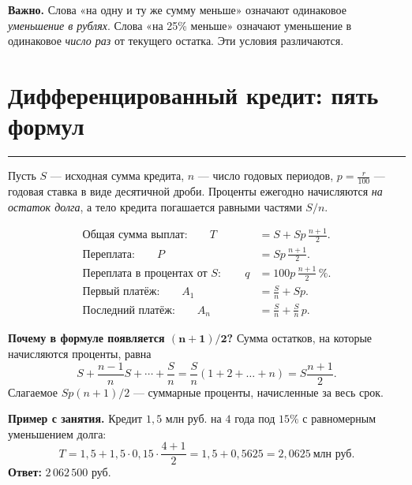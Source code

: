 \documentclass[a4paper,11pt]{article}
\newcommand{\key}[1]{\textcolor{darkaccent}{\textbf{#1}}}
\newcommand{\sepheading}[1]{\section{#1}\vspace{-4pt}\noindent\textcolor{accent}{\rule{\linewidth}{0.45pt}}\vspace{1pt}}
\begin{document}
\key{Важно.} Слова «на одну и ту же сумму меньше» означают одинаковое \emph{уменьшение в рублях}. Слова «на 25\% меньше» означают уменьшение в одинаковое \emph{число раз} от текущего остатка. Эти условия различаются.

\sepheading{Дифференцированный кредит: пять формул}
Пусть $S$ --- исходная сумма кредита, $n$ --- число годовых периодов, $p=\frac{r}{100}$ --- годовая ставка в виде десятичной дроби. Проценты ежегодно начисляются \emph{на остаток долга}, а тело кредита погашается равными частями $S/n$.

\begin{align*}
\text{Общая сумма выплат:}\qquad
T&=S+Sp\,\frac{n+1}{2}.\\[2pt]
\text{Переплата:}\qquad
P&=Sp\,\frac{n+1}{2}.\\[2pt]
\text{Переплата в процентах от }S:\qquad
q&=100p\,\frac{n+1}{2}\,\%.\\[2pt]
\text{Первый платёж:}\qquad
A_1&=\frac Sn+Sp.\\[2pt]
\text{Последний платёж:}\qquad
A_n&=\frac Sn+\frac Sn\,p.
\end{align*}

\textbf{Почему в формуле появляется $\boldsymbol{(n+1)/2}$?} Сумма остатков, на которые начисляются проценты, равна
\[
S+\frac{n-1}{n}S+\cdots+\frac Sn
=\frac Sn(1+2+\dots+n)=S\frac{n+1}{2}.
\]
Слагаемое $Sp(n+1)/2$ --- суммарные проценты, начисленные за весь срок.

\textcolor{darkaccent}{\textbf{Пример с занятия.}} Кредит $1{,}5$ млн руб. на $4$ года под $15\%$ с равномерным уменьшением долга:
\[
T=1{,}5+1{,}5\cdot0{,}15\cdot\frac{4+1}{2}
=1{,}5+0{,}5625=2{,}0625\ \text{млн руб.}
\]
\key{Ответ:} $2\,062\,500$ руб.
\end{document}
